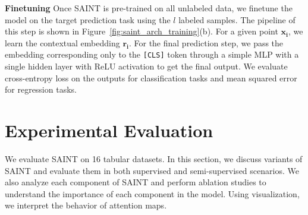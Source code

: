 \documentclass{article}
\begin{document}
\textbf{Finetuning} Once SAINT is pre-trained on all unlabeled data, we finetune the model on the target prediction task using the $l$ labeled samples.  The pipeline of this step is shown in Figure~\ref{fig:saint_arch_training}(b). For a given point $\mathbf{x_i}$, we learn the contextual embedding $\mathbf{r_i}$. For the final prediction step, we pass the embedding corresponding only to the \verb|[CLS]| token through a simple MLP with a single hidden layer with ReLU activation to get the final output. We evaluate cross-entropy loss on the outputs for classification tasks and mean squared error for regression tasks.

\section{Experimental Evaluation}
\label{sec:expts}
We evaluate SAINT on 16 tabular datasets. In this section, we discuss variants of SAINT and evaluate them in both supervised and semi-supervised scenarios. We also analyze each component of SAINT and perform ablation studies to understand the importance of each component in the model. Using visualization, we interpret the behavior of attention maps.   

\begin{table}
\captionsetup{width=8cm,font=small}
    \caption{Configurations of SAINT. The number of stages is denoted by $L$, and the number of heads in each attention layer is represented by $h$. The parameter count is averaged over 14 datasets and is measured for batches of 32 inputs. Time measures the cost of 100 epochs of training plus inference on the best model, averaged over 14 datasets. See Appendix Section~\ref{appendix_sec:complete_training_deets} for hardware specifications.}
    \label{table:SAINT_config}
\end{table} 
\end{document}
